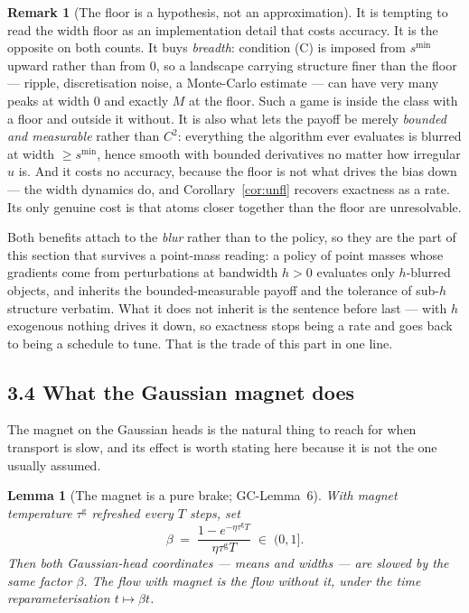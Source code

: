 \documentclass[11pt]{article}
\newtheorem{lemma}[theorem]{Lemma}
\theoremstyle{definition}
\newtheorem{remark}[theorem]{Remark}
\newcommand{\GC}[1]{\textsf{GC-#1}}
\begin{document}
\begin{remark}[The floor is a hypothesis, not an approximation]\label{rem:floor}
It is tempting to read the width floor as an implementation detail that costs
accuracy. It is the opposite on both counts. It buys \emph{breadth}: condition (C)
is imposed from $s^{\min}$ upward rather than from $0$, so a landscape carrying
structure finer than the floor --- ripple, discretisation noise, a Monte-Carlo
estimate --- can have very many peaks at width $0$ and exactly $M$ at the floor.
Such a game is inside the class with a floor and outside it without. It is also
what lets the payoff be merely \emph{bounded and measurable} rather than $C^2$:
everything the algorithm ever evaluates is blurred at width $\ge s^{\min}$, hence
smooth with bounded derivatives no matter how irregular $u$ is. And it costs no
accuracy, because the floor is not what drives the bias down --- the width
dynamics do, and Corollary~\ref{cor:unfl} recovers exactness as a rate. Its only
genuine cost is that atoms closer together than the floor are unresolvable.

Both benefits attach to the \emph{blur} rather than to the policy, so they are the
part of this section that survives a point-mass reading: a policy of point masses
whose gradients come from perturbations at bandwidth $h > 0$ evaluates only
$h$-blurred objects, and inherits the bounded-measurable payoff and the tolerance
of sub-$h$ structure verbatim. What it does not inherit is the sentence before
last --- with $h$ exogenous nothing drives it down, so exactness stops being a rate
and goes back to being a schedule to tune. That is the trade of this part in one
line.
\end{remark}

\subsection*{3.4 What the Gaussian magnet does}

The magnet on the Gaussian heads is the natural thing to reach for when transport
is slow, and its effect is worth stating here because it is not the one usually
assumed.

\begin{lemma}[The magnet is a pure brake; \GC{Lemma~6}]\label{lem:brake}
With magnet temperature $\tau^{\mathrm g}$ refreshed every $T$ steps, set
\[
  \beta \;=\; \frac{1 - e^{-\eta\tau^{\mathrm g}T}}{\eta\tau^{\mathrm g}T}
  \;\in\; (0,1].
\]
Then \emph{both} Gaussian-head coordinates --- means and widths --- are slowed by
the same factor $\beta$. The flow with magnet is the flow without it, under the
time reparameterisation $t \mapsto \beta t$.
\end{lemma}
\end{document}
